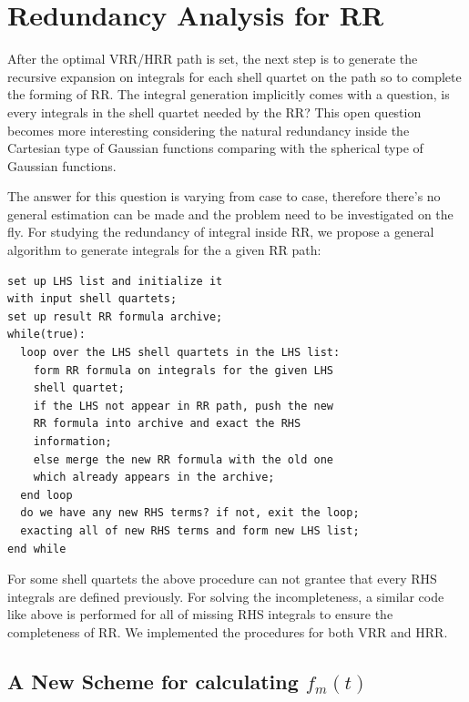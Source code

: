 \section{Redundancy Analysis for RR}
\label{redundancy_rr}

After the optimal VRR/HRR path is set, the next step is to generate 
the recursive expansion on integrals for each shell quartet on the 
path so to complete the forming of RR. The integral
generation implicitly comes with a question, is every integrals in 
the shell quartet needed by the RR? This open question becomes more 
interesting considering the natural redundancy inside the Cartesian 
type of Gaussian functions comparing with the spherical type of Gaussian
functions.

The answer for this question is varying from case to case, therefore there's 
no general estimation can be made and the problem need to be investigated 
on the fly. For studying the redundancy of integral inside RR, we propose
a general algorithm to generate integrals for the a given RR path:
\begin{verbatim}
set up LHS list and initialize it
with input shell quartets;
set up result RR formula archive;
while(true):
  loop over the LHS shell quartets in the LHS list:
    form RR formula on integrals for the given LHS 
    shell quartet;
    if the LHS not appear in RR path, push the new 
    RR formula into archive and exact the RHS 
    information;
    else merge the new RR formula with the old one
    which already appears in the archive;
  end loop
  do we have any new RHS terms? if not, exit the loop;
  exacting all of new RHS terms and form new LHS list;
end while
\end{verbatim}
For some shell quartets the above procedure can not grantee that every
RHS integrals are defined previously. For solving the incompleteness,
a similar code like above is performed for all of missing RHS integrals
to ensure the completeness of RR. We implemented the procedures for 
both VRR and HRR.


\subsection{A New Scheme for calculating $f_{m}(t)$}
\label{fmt}

